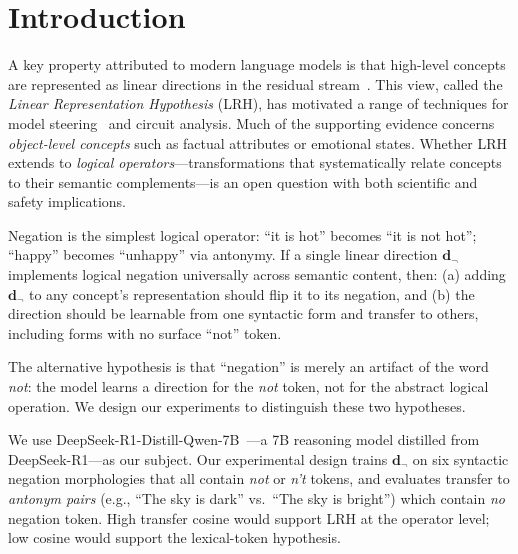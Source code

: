 \documentclass{article}
\begin{document}
\section{Introduction}
\label{sec:intro}

A key property attributed to modern language models is that high-level concepts are represented as linear directions in the residual stream~\citep{park2024linear}.
This view, called the \emph{Linear Representation Hypothesis} (LRH), has motivated a range of techniques for model steering~\citep{zou2023representation} and circuit analysis.
Much of the supporting evidence concerns \emph{object-level concepts} such as factual attributes or emotional states.
Whether LRH extends to \emph{logical operators}---transformations that systematically relate concepts to their semantic complements---is an open question with both scientific and safety implications.

Negation is the simplest logical operator: ``it is hot'' becomes ``it is not hot''; ``happy'' becomes ``unhappy'' via antonymy.
If a single linear direction $\mathbf{d}_{\neg}$ implements logical negation universally across semantic content, then:
(a) adding $\mathbf{d}_{\neg}$ to any concept's representation should flip it to its negation, and
(b) the direction should be learnable from one syntactic form and transfer to others, including forms with no surface ``not'' token.

The alternative hypothesis is that ``negation'' is merely an artifact of the word \textit{not}: the model learns a direction for the \textit{not} token, not for the abstract logical operation.
We design our experiments to distinguish these two hypotheses.

We use DeepSeek-R1-Distill-Qwen-7B~\citep{deepseek2025r1}---a 7B reasoning model distilled from DeepSeek-R1---as our subject.
Our experimental design trains $\mathbf{d}_{\neg}$ on six syntactic negation morphologies that all contain \textit{not} or \textit{n't} tokens, and evaluates transfer to \emph{antonym pairs} (e.g., ``The sky is dark'' vs.\ ``The sky is bright'') which contain \emph{no} negation token.
High transfer cosine would support LRH at the operator level; low cosine would support the lexical-token hypothesis.
\end{document}
